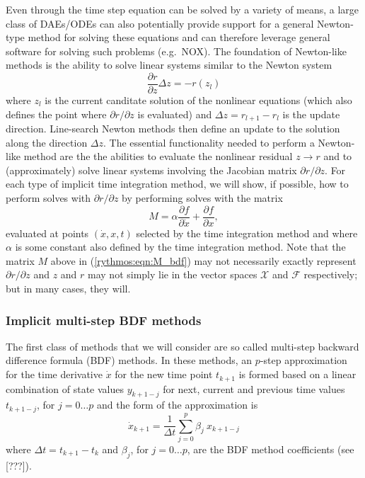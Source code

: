 \documentclass[pdf,ps2pdf,11pt]{SANDreport}
\begin{document}
Even through the time step equation can be solved by a variety of means, a
large class of DAEs/ODEs can also potentially provide support for a general
Newton-type method for solving these equations and can therefore leverage
general software for solving such problems (e.g.\ NOX).  The foundation of
Newton-like methods is the ability to solve linear systems similar to the
Newton system
%
\begin{equation}
\frac{\partial r}{\partial z} \Delta z = - r(z_l)
\end{equation}
%
where $z_l$ is the current canditate solution of the nonlinear equations
(which also defines the point where $\partial r / {}\partial z$ is evaluated)
and $\Delta z = r_{l+1} - r_l$ is the update direction.  Line-search Newton
methods then define an update to the solution along the direction $\Delta z$.
The essential functionality needed to perform a Newton-like method are the the
abilities to evaluate the nonlinear residual $z {}\rightarrow r$ and to
(approximately) solve linear systems involving the Jacobian matrix ${}\partial
r / {}\partial z$.  For each type of implicit time integration method, we will
show, if possible, how to perform solves with ${}\partial r / {}\partial z$ by
performing solves with the matrix
%
\begin{equation}
M = \alpha \frac{\partial f}{\partial \dot{x}} + \frac{\partial f}{\partial x},
\label{rythmos:eqn:M}
\end{equation}
%
evaluated at points $(\dot{x},x,t)$ selected by the time integration method
and where $\alpha$ is some constant also defined by the time integration
method.  Note that the matrix $M$ above in (\ref{rythmos:eqn:M_bdf}) may not
necessarily exactly represent ${}\partial r / {}\partial z$ and $z$ and $r$
may not simply lie in the vector spaces $\mathcal{X}$ and $\mathcal{F}$
respectively; but in many cases, they will.

\subsubsection{Implicit multi-step BDF methods}

The first class of methods that we will consider are so called multi-step
backward difference formula (BDF) methods.  In these methods, an $p$-step
approximation for the time derivative $\dot{x}$ for the new time point
$t_{k+1}$ is formed based on a linear combination of state values $y_{k+1-j}$
for next, current and previous time values $t_{k+1-j}$, for $j = 0 {}\ldots p$
and the form of the approximation is
%
\begin{equation}
\dot{x}_{k+1} = \frac{1}{\Delta t} \sum_{j=0}^{p} \beta_j \: x_{k+1-j}
\label{rythmos:eqn:bdf_x_dot}
\end{equation}
%
where $\Delta t = t_{k+1} - t_k$ and $\beta_j$, for $j=0 {}\ldots p$, are the
BDF method coefficients (see [???]).
\end{document}
